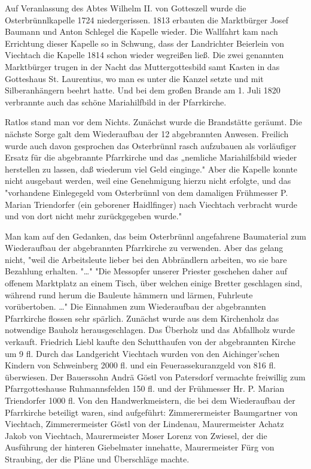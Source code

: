 \documentclass{book}
\begin{document}
Auf Veranlassung des Abtes Wilhelm II. von Gotteszell wurde die
Osterbrünnlkapelle 1724 niedergerissen. 1813 erbauten die Marktbürger Josef
Baumann und Anton Schlegel die Kapelle wieder. Die Wallfahrt kam nach Errichtung
dieser Kapelle so in Schwung, dass der Landrichter Beierlein von Viechtach die
Kapelle 1814 schon wieder wegreißen ließ. Die zwei genannten Marktbürger trugen
in der Nacht das Muttergottesbild samt Kasten in das Gotteshaus St. Laurentius,
wo man es unter die Kanzel setzte und mit Silberanhängern beehrt hatte. Und bei
dem großen Brande am 1. Juli 1820 verbrannte auch das schöne Mariahilfbild in
der Pfarrkirche.

Ratlos stand man vor dem Nichts. Zunächst wurde die Brandstätte geräumt. Die
nächste Sorge galt dem Wiederaufbau der 12 abgebrannten Anwesen. Freilich wurde
auch davon gesprochen das Osterbrünnl rasch aufzubauen als vorläufiger Ersatz
für die abgebrannte Pfarrkirche und das „nemliche Mariahilfsbild wieder
herstellen zu lassen, daß wiederum viel Geld einginge." Aber die Kapelle konnte
nicht ausgebaut werden, weil eine Genehmigung hierzu nicht erfolgte, und das
"vorhandene Einlegegeld vom Osterbrünnl von dem damaligen Frühmesser P. Marian
Triendorfer (ein geborener Haidlfinger) nach Viechtach verbracht wurde und von
dort nicht mehr zurückgegeben wurde."

Man kam auf den Gedanken, das beim Osterbrünnl angefahrene Baumaterial zum
Wiederaufbau der abgebrannten Pfarrkirche zu verwenden. Aber das gelang nicht,
"weil die Arbeitsleute lieber bei den Abbrändlern arbeiten, wo sie bare
Bezahlung erhalten. "…" "Die Messopfer unserer Priester geschehen daher auf
offenem Marktplatz an einem Tisch, über welchen einige Bretter geschlagen sind,
während rund herum die Bauleute hämmern und lärmen, Fuhrleute vorübertoben. …"
Die Einnahmen zum Wiederaufbau der abgebrannten Pfarrkirche flossen sehr
spärlich. Zunächst wurde aus dem Kirchenholz das notwendige Bauholz
herausgeschlagen. Das Überholz und das Abfallholz wurde verkauft. Friedrich
Liebl kaufte den Schutthaufen von der abgebrannten Kirche um 9 fl. Durch das
Landgericht Viechtach wurden von den Aichinger'schen Kindern von Schweinberg
2000 fl. und ein Feuerassekuranzgeld von 816 fl. überwiesen. Der Bauerssohn
Andrä Göstl von Patersdorf vermachte freiwillig zum Pfarrgotteshause
Ruhmannsfelden 150 fl. und der Frühmesser Hr. P. Marian Triendorfer 1000 fl. Von
den Handwerkmeistern, die bei dem Wiederaufbau der Pfarrkirche beteiligt waren,
sind aufgeführt: Zimmerermeister Baumgartner von Viechtach, Zimmerermeister
Göstl von der Lindenau, Maurermeister Achatz Jakob von Viechtach, Maurermeister
Moser Lorenz von Zwiesel, der die Ausführung der hinteren Giebelmater innehatte,
Maurermeister Fürg von Straubing, der die Pläne und Überschläge machte.
\end{document}
